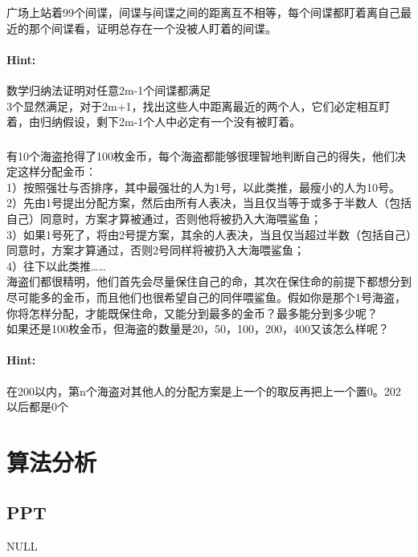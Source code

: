 \documentclass{article}
\begin{document}
     \subsubsection{}广场上站着99个间谍，间谍与间谍之间的距离互不相等，每个间谍都盯着离自己最近的那个间谍看，证明总存在一个没被人盯着的间谍。
     \paragraph{Hint:}数学归纳法证明对任意2m-1个间谍都满足\\
     3个显然满足，对于2m+1，找出这些人中距离最近的两个人，它们必定相互盯着，由归纳假设，剩下2m-1个人中必定有一个没有被盯着。
     
     
     \subsubsection{}有10个海盗抢得了100枚金币，每个海盗都能够很理智地判断自己的得失，他们决定这样分配金币： \\
1）按照强壮与否排序，其中最强壮的人为1号，以此类推，最瘦小的人为10号。\\
2）先由1号提出分配方案，然后由所有人表决，当且仅当等于或多于半数人（包括自己）同意时，方案才算被通过，否则他将被扔入大海喂鲨鱼；\\
3）如果1号死了，将由2号提方案，其余的人表决，当且仅当超过半数（包括自己）同意时，方案才算通过，否则2号同样将被扔入大海喂鲨鱼；\\
4）往下以此类推…… \\
海盗们都很精明，他们首先会尽量保住自己的命，其次在保住命的前提下都想分到尽可能多的金币，而且他们也很希望自己的同伴喂鲨鱼。假如你是那个1号海盗，你将怎样分配，才能既保住命，又能分到最多的金币？最多能分到多少呢？\\
如果还是100枚金币，但海盗的数量是20，50，100，200，400又该怎么样呢？
     \paragraph{Hint:}在200以内，第n个海盗对其他人的分配方案是上一个的取反再把上一个置0。202以后都是0个
     
     
     \section{算法分析}
     \subsection{PPT}
     NULL
     
\end{document}
